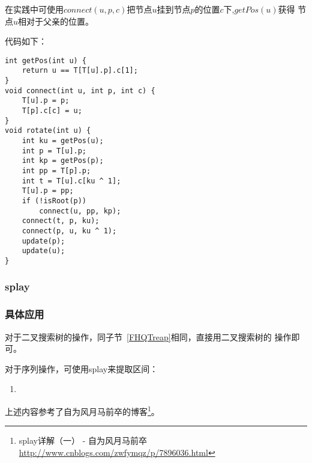 在实践中可使用$connect(u,p,c)$把节点$u$挂到节点$p$的位置$c$下,$getPos(u)$获得
节点$u$相对于父亲的位置。

代码如下：

\begin{lstlisting}[title=rotate]
int getPos(int u) {
    return u == T[T[u].p].c[1];
}
void connect(int u, int p, int c) {
    T[u].p = p;
    T[p].c[c] = u;
}
void rotate(int u) {
    int ku = getPos(u);
    int p = T[u].p;
    int kp = getPos(p);
    int pp = T[p].p;
    int t = T[u].c[ku ^ 1];
    T[u].p = pp;
    if (!isRoot(p))
        connect(u, pp, kp);
    connect(t, p, ku);
    connect(p, u, ku ^ 1);
    update(p);
    update(u);
}
\end{lstlisting}

\subsubsection{splay}

\subsubsection{具体应用}

对于二叉搜索树的操作，同子节~\ref{FHQTreap}相同，直接用二叉搜索树的
操作即可。

对于序列操作，可使用splay来提取区间：

\begin{enumerate}
    \item
\end{enumerate}

上述内容参考了自为风月马前卒的博客\footnote{splay详解（一） - 自为风月马前卒
\url{http://www.cnblogs.com/zwfymqz/p/7896036.html}}。
